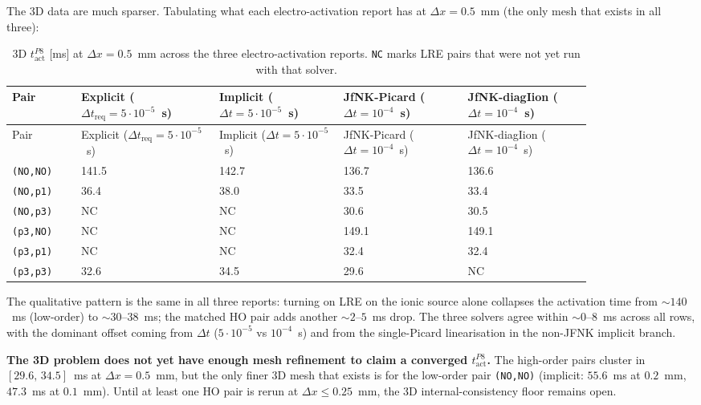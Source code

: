 \documentclass[11pt,a4paper]{article}
\newcommand{\tact}{t_{\text{act}}^{P8}}
\newcommand{\code}[1]{\texttt{\small #1}}
\begin{document}
The 3D data are much sparser. Tabulating what each electro-activation
report has at $\Delta x = 0.5$~mm (the only mesh that exists in all
three):

\begin{center}\footnotesize
\begin{longtable}{p{0.10\linewidth}p{0.20\linewidth}p{0.18\linewidth}p{0.18\linewidth}p{0.18\linewidth}}
\caption{3D $\tact$ [ms] at $\Delta x = 0.5$~mm across the three
electro-activation reports. \code{NC} marks LRE pairs that were not
yet run with that solver.}\\
\toprule
Pair & Explicit ($\Delta t_{\text{req}}=5\!\cdot\!10^{-5}$~s)
     & Implicit ($\Delta t=5\!\cdot\!10^{-5}$~s)
     & JfNK-Picard ($\Delta t=10^{-4}$~s)
     & JfNK-diagIion ($\Delta t=10^{-4}$~s) \\
\midrule\endfirsthead\toprule
Pair & Explicit ($\Delta t_{\text{req}}=5\!\cdot\!10^{-5}$~s)
     & Implicit ($\Delta t=5\!\cdot\!10^{-5}$~s)
     & JfNK-Picard ($\Delta t=10^{-4}$~s)
     & JfNK-diagIion ($\Delta t=10^{-4}$~s) \\
\midrule\endhead
\code{(NO,NO)} & 141.5 & 142.7 & 136.7 & 136.6 \\
\code{(NO,p1)} &  36.4 &  38.0 &  33.5 &  33.4 \\
\code{(NO,p3)} & NC    & NC    &  30.6 &  30.5 \\
\code{(p3,NO)} & NC    & NC    & 149.1 & 149.1 \\
\code{(p3,p1)} & NC    & NC    &  32.4 &  32.4 \\
\code{(p3,p3)} &  32.6 &  34.5 &  29.6 & NC    \\
\bottomrule
\end{longtable}\end{center}

The qualitative pattern is the same in all three reports: turning on
LRE on the ionic source alone collapses the activation time from
$\sim 140$~ms (low-order) to $\sim 30$--$38$~ms; the matched HO pair
adds another $\sim 2$--$5$~ms drop. The three solvers agree within
$\sim 0$--$8$~ms across all rows, with the dominant offset coming
from $\Delta t$ ($5\!\cdot\!10^{-5}$ vs $10^{-4}$~s) and from the
single-Picard linearisation in the non-JFNK implicit branch.

\textbf{The 3D problem does not yet have enough mesh refinement to
claim a converged $\tact$.} The high-order pairs cluster in
$[29.6,\,34.5]$~ms at $\Delta x = 0.5$~mm, but the only finer 3D mesh
that exists is for the low-order pair \code{(NO,NO)} (implicit:
$55.6$~ms at $0.2$~mm, $47.3$~ms at $0.1$~mm). Until at least one HO
pair is rerun at $\Delta x \le 0.25$~mm, the 3D internal-consistency
floor remains open.
\end{document}

